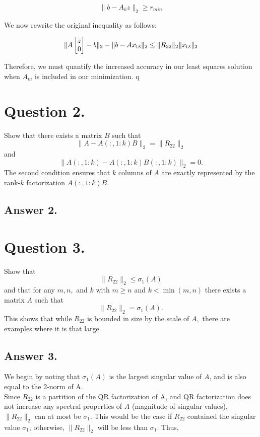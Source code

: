 \documentclass[12pt]{article}
\newcommand{\ls}{\textsc{ls}}
\begin{document}
$$\| b - A_k z\|_2 \geq r_{min}$$

We now rewrite the original inequality as follows:

$$\|A\begin{bmatrix}z \\ 0\end{bmatrix}-b\|_2 - \|b-Ax_{\ls}\|_2 \leq \|R_{22}\|_2\|x_{\ls}\|_2$$

Therefore, we must quantify the increased accuracy in our least squares solution when $A_m$ is included in our minimization. q


\section*{Question 2.}
Show that there exists a matrix $B$ such that
\[
    \|A - A(:,1:k)B\|_2 = \|R_{22}\|_2
\]
and 
\[
    \|A(:,1:k) - A(:,1:k)B(:,1:k)\|_2 = 0.
\]
The second condition ensures that $k$ columns of $A$ are exactly represented by the rank-$k$ factorization $A(:,1:k)B.$

\subsection*{Answer 2.}

\section*{Question 3.}
Show that
\[
    \|R_{22}\|_2\leq \sigma_1(A)
\]
and that for any $m,n,$ and $k$ with $m\geq n$ and $k < \min(m,n)$ there exists a matrix $A$ such that
\[
    \|R_{22}\|_2 = \sigma_1(A).
\]
This shows that while $R_{22}$ is bounded in size by the scale of $A,$ there are examples where it is that large.

\subsection*{Answer 3.}

We begin by noting that $\sigma_1(A)$ is the largest singular value of $A$, and is also equal to the 2-norm of A. \\

Since $R_{22}$ is a partition of the QR factorization of A, and QR factorization does not increase any spectral properties of $A$ (magnitude of singular values), $\|R_{22}\|_2$ can at most be $\sigma_1$. This would be the case if $R_{22}$ contained the singular value $\sigma_1$, otherwise,  $\|R_{22}\|_2$ will be less than $\sigma_1$. Thus,
\end{document}
